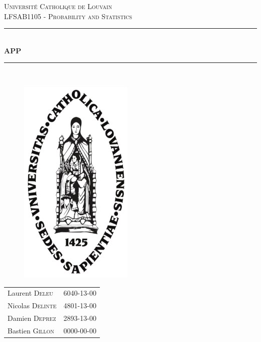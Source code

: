 \documentclass[a4paper]{article}
\begin{document}
\begin{titlepage}
\newcommand{\HRule}{\rule{\linewidth}{0.5mm}} 
\center 
\textsc{\Large Universit\'e Catholique de Louvain}\\[1cm] 
\textsc{\LARGE LFSAB1105 - Probability and Statistics}\\[0.5cm] 

\HRule \\[0.4cm]
{ \huge \bfseries APP}\\ [0.4cm]
\HRule \\[0.1cm]
\vspace{1cm}
\begin{figure}[ht]
\centering
\includegraphics [height=10cm] {img/ucl}
\end{figure}
\vspace{1cm}
\begin{minipage}{0.7\textwidth}
\begin{center}
\begin{tabular}{lc}
Laurent \textsc{Deleu} & 6040-13-00 \\
Nicolas \textsc{Delinte} & 4801-13-00\\
Damien \textsc{Deprez} & 2893-13-00 \\
Bastien \textsc{Gillon} & 0000-00-00\\

\end{tabular}
\end{center}

\end{minipage}\\[1cm]


\end{titlepage}
\end{document}
